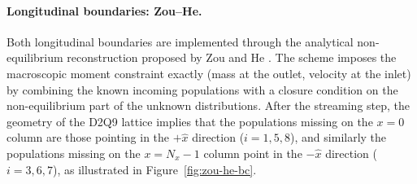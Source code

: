 \paragraph{Longitudinal boundaries: Zou--He.}
Both longitudinal boundaries are implemented through the analytical non-equilibrium reconstruction proposed by Zou and He \cite{zou1997analytical}.
The scheme imposes the macroscopic moment constraint exactly (mass at the outlet, velocity at the inlet) by combining the known incoming populations with a closure condition on the non-equilibrium part of the unknown distributions.
After the streaming step, the geometry of the D2Q9 lattice implies that the populations missing on the $x=0$ column are those pointing in the $+\hat{x}$ direction ($i=1, 5, 8$), and similarly the populations missing on the $x=N_x-1$ column point in the $-\hat{x}$ direction ($i=3, 6, 7$), as illustrated in Figure~\ref{fig:zou-he-bc}.

